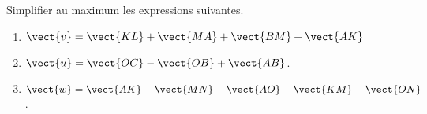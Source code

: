 
\begin{exercice}\label{exosmath-0067}

Simplifier au maximum les expressions suivantes.
\begin{enumerate}
    \item
        \( \vect{ v }=\vect{ KL }+\vect{ MA }+\vect{ BM }+\vect{ AK }\)
    \item
        \( \vect{ u }=\vect{ OC }-\vect{ OB }+\vect{ AB }\).
    \item
        \( \vect{ w }=\vect{ AK }+\vect{ MN }-\vect{ AO }+\vect{ KM }-\vect{ ON }\).
\end{enumerate}


\end{exercice}
